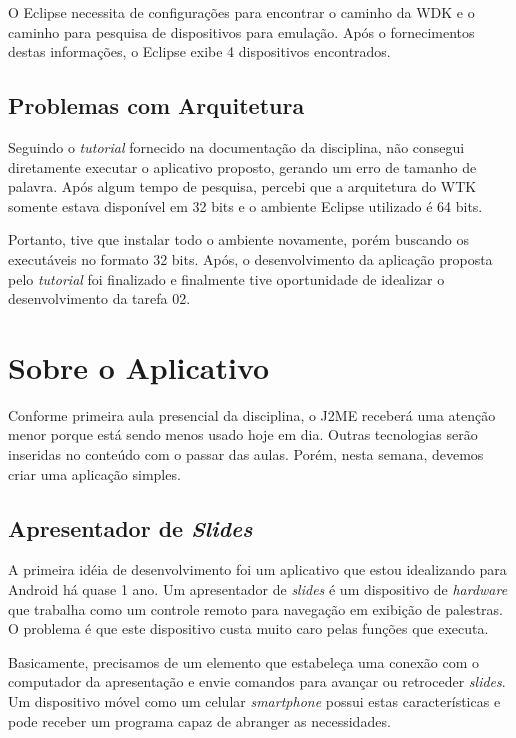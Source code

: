 \documentclass{article}
\begin{document}
O Eclipse necessita de configurações para encontrar o caminho da WDK e o caminho
para pesquisa de dispositivos para emulação. Após o fornecimentos destas
informações, o Eclipse exibe 4 dispositivos encontrados.

\subsection{Problemas com Arquitetura}

Seguindo o \emph{tutorial} fornecido na documentação da disciplina, não consegui
diretamente executar o aplicativo proposto, gerando um erro de tamanho de
palavra. Após algum tempo de pesquisa, percebi que a arquitetura do WTK
somente estava disponível em 32 bits e o ambiente Eclipse utilizado é 64 bits.

Portanto, tive que instalar todo o ambiente novamente, porém buscando os
executáveis no formato 32 bits. Após, o desenvolvimento da aplicação proposta
pelo \emph{tutorial} foi finalizado e finalmente tive oportunidade de idealizar
o desenvolvimento da tarefa 02.

\section{Sobre o Aplicativo}
\label{sec:sobre}

Conforme primeira aula presencial da disciplina, o J2ME receberá uma atenção
menor porque está sendo menos usado hoje em dia. Outras tecnologias serão
inseridas no conteúdo com o passar das aulas. Porém, nesta semana, devemos criar
uma aplicação simples.

\subsection{Apresentador de \emph{Slides}}

A primeira idéia de desenvolvimento foi um aplicativo que estou idealizando para
Android há quase 1 ano. Um apresentador de \emph{slides} é um dispositivo de
\emph{hardware} que trabalha como um controle remoto para navegação em exibição
de palestras. O problema é que este dispositivo custa muito caro pelas funções
que executa.

Basicamente, precisamos de um elemento que estabeleça uma conexão com o
computador da apresentação e envie comandos para avançar ou retroceder
\emph{slides}. Um dispositivo móvel como um celular \emph{smartphone} possui
estas características e pode receber um programa capaz de abranger as
necessidades.
\end{document}
